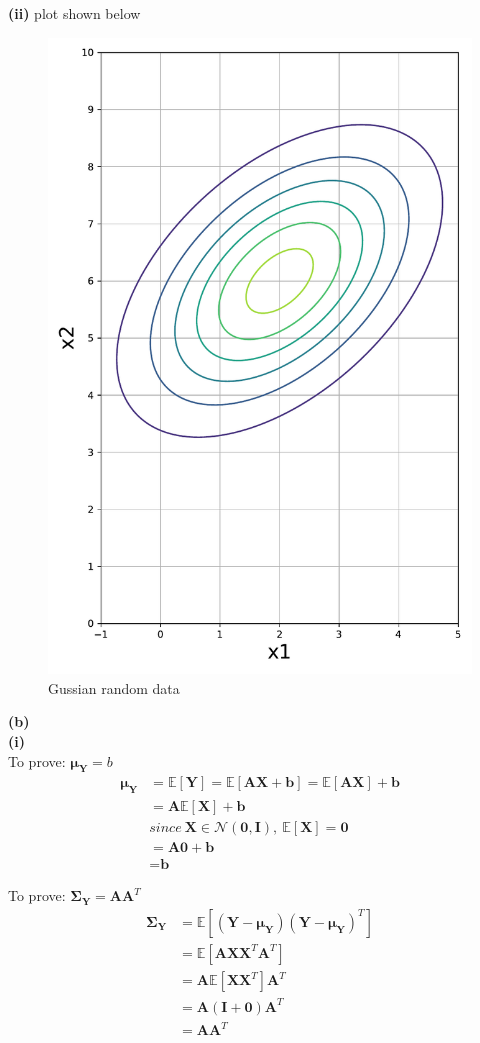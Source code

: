 \documentclass[11pt]{article}
\begin{document}
\textbf{(ii)}
plot shown below
\begin{figure}[h]
\centering
\includegraphics[width=0.45\linewidth]{exercise3_a}
\caption{Gussian random data}
\label{fig: figure 1}
\end{figure}
\pagebreak

\noindent\textbf{(b)}\\

\textbf{(i)}\\

To prove: $\pmb{\mu}_\textbf{Y}=b$
\begin{equation} \label{eq3}
\begin{split}
\pmb{\mu}_\textbf{Y}&=\mathbb{E}[\textbf{Y}]=\mathbb{E}[\textbf{A}\textbf{X}+\textbf{b}]=\mathbb{E}[\textbf{A}\textbf{X}]+\textbf{b} \\
&=\textbf{A}\mathbb{E}[\textbf{X}]+\textbf{b}\\
&since\ \textbf{X}\in \mathcal{N}(\textbf{0},\textbf{I}),\ \mathbb{E}[\textbf{X}]=\textbf{0}\\
&=\textbf{A}\textbf{0}+\textbf{b}\\
&=\textbf{b}
\end{split}
\end{equation}

To prove: $\pmb{\Sigma}_\textbf{Y}=\textbf{A}\textbf{A}^T$
\begin{equation} \label{eq4}
\begin{split}
\pmb{\Sigma}_\textbf{Y}&=\mathbb{E}[(\textbf{Y}-\pmb{\mu}_\textbf{Y})(\textbf{Y}-\pmb{\mu}_\textbf{Y})^T]\\
&=\mathbb{E}[\textbf{AX}\textbf{X}^T\textbf{A}^T]\\
&=\textbf{A}\mathbb{E}[\textbf{XX}^T]\textbf{A}^T\\
&=\textbf{A}(\textbf{I}+\textbf{0})\textbf{A}^T\\
&=\textbf{AA}^T
\end{split}
\end{equation}
\end{document}

